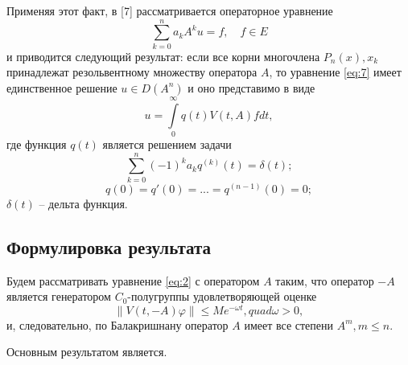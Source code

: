 \documentclass[1244sdpt,a4paper]{article}
\theoremstyle{plain}
\numberwithin{equation}{section}
\begin{document}
Применяя этот факт, в [7] рассматривается операторное уравнение
\begin{equation}
    \label{eq:7}
    \sum_{k=0}^{n} a_k A^k u = f, \quad f \in E
\end{equation}
и приводится следующий результат: если все корни многочлена $P_n(x), x_k$ принадлежат резольвентному множеству
оператора $A$, то уравнение \ref{eq:7} имеет единственное решение $u \in D(A^n)$ и оно представимо в виде
\begin{equation}
    u = \int\limits_0^\infty q(t) V(t, A)fdt,
\end{equation}
где функция $q(t)$ является решением задачи
\begin{equation}
    \label{eq:14}
    \sum_{k=0}^{n} (-1)^k a_k q^{(k)}(t) = \delta(t);
\end{equation}
\begin{equation}
    q(0) = q'(0) = ... = q^{(n-1)}(0) = 0;
\end{equation}
$\delta(t)$ -- дельта функция.

\subsection{Формулировка результата}

Будем рассматривать уравнение \ref{eq:2} с оператором $A$ таким, что оператор $-A$ является генератором
$C_0$-полугруппы удовлетворяющей оценке
\begin{equation}
    \|V(t, -A)\varphi\| \le Me^{-\omega t}, quad \omega > 0,
\end{equation}
и, следовательно, по Балакришнану оператор $A$ имеет все степени $A^m, m \le n$.

Основным результатом является.
\end{document}
